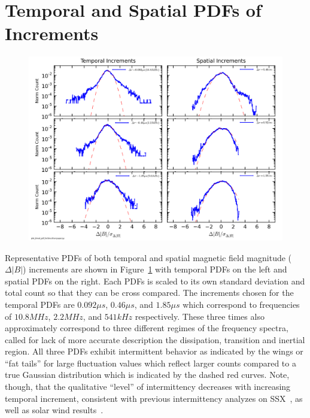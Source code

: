 \documentclass[aps,prl,amsmath,amssymb,reprint,superscriptaddress]{revtex4-1} %
\begin{document}
\section{Temporal and Spatial PDFs of Increments}\label{sec:pdfs}

\begin{figure}[!htbp]
\centerline{
\includegraphics[width=17cm]{Bmod_pdf_temporal_and_spatial_100313Shots41to80_forStructFuncpaper.png}}
\caption{\label{fig:pdfs} }
\end{figure}

Representative PDFs of both temporal and spatial magnetic field magnitude ($\Delta |B|$) increments are shown in Figure~\ref{fig:pdfs} with temporal PDFs on the left and spatial PDFs on the right. Each PDFs is scaled to its own standard deviation and total count so that they can be cross compared. The increments chosen for the temporal PDFs are $0.092\mu s$, $0.46\mu s$, and $1.85\mu s$ which correspond to frequencies of $10.8MHz$, $2.2MHz$, and $541kHz$ respectively. These three times also approximately correspond to three different regimes of the frequency spectra, called for lack of more accurate description the dissipation, transition and inertial region. All three PDFs exhibit intermittent behavior as indicated by the wings or ``fat tails'' for large fluctuation values which reflect larger counts compared to a true Gaussian distribution which is indicated by the dashed red curves. Note, though, that the qualitative ``level'' of intermittency decreases with increasing temporal increment, consistent with previous intermittency analyzes on SSX~\cite{schaffner2014a,schaffner2014b}, as well as solar wind results~\cite{bruno2013}.
\end{document}

